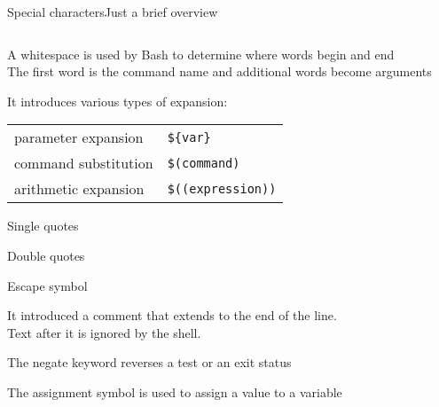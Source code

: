 \begin{frame}[fragile]{Special characters}{Just a brief overview}
    \vspace{-5mm}
    \begin{columns}
        \begin{column}{\dimexpr\paperwidth-10mm}
            \begin{description}[\texttt{>  >>  <}]
                \setlength{\itemsep}{1mm}
                \item<only@1>[\texttt{\textvisiblespace}]
                    A \alert{white}\alert{space} is used by Bash to determine where words begin and end \\
                    The first word is the command name and additional words become arguments
                \item<only@1>[\texttt{\$}]
                    It introduces various types of \alert{expansion}:
                    \begin{tabular}{ll}
                        \PB{$\bullet\;$} parameter expansion   & \texttt{\$\{var\}}          \\
                        \PB{$\bullet\;$} command substitution  & \texttt{\$(command)}      \\
                        \PB{$\bullet\;$} arithmetic expansion  & \texttt{\$((expression))} \\
                    \end{tabular}
                \item<only@1>[\texttt{' '}] \alert{Single quotes}
                \item<only@1>[\texttt{" "}] \alert{Double quotes}
                \item<only@1>[\texttt{\textbackslash}] \alert{Escape symbol}
                \item<only@1>[\texttt{\#}]
                    It introduced a \alert{comment} that extends to the end of the line. \\
                    Text after it is ignored by the shell. 
                \item<only@1>[\texttt{!}]
                    The \alert{negate keyword} reverses a test or an exit status
                \item<only@2>[\texttt{=}]
                    The \alert{assignment} symbol is used to assign a value to a variable \\

\end{description}
\end{column}
\end{columns}
\end{frame}
